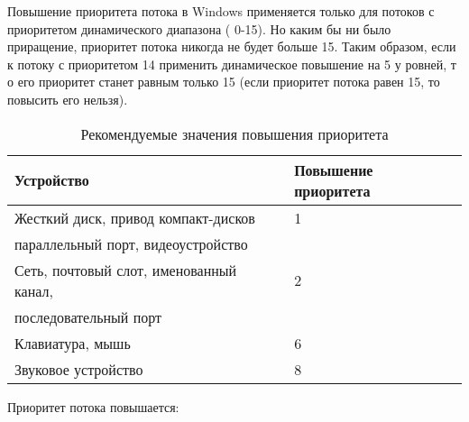 Повышение приоритета потока в Windows применяется только для потоков
с приоритетом динамического диапазона ( 0-15). Но каким бы ни было
приращение, приоритет потока никогда не будет больше 15. Таким образом,
если к потоку с приоритетом 14 применить динамическое повышение на 5
у ровней, т о его приоритет станет равным только 15 (если приоритет
потока равен 15, то повысить его нельзя).

\begin{table}[H]
    \centering
    \caption{Рекомендуемые значения повышения приоритета}
    \begin{tabular}{|l|l|}
        \hline
        \textbf{Устройство} & \textbf{Повышение приоритета} \\
        \hline
        \hline
        Жесткий диск, привод компакт-дисков & 1 \\
        параллельный порт, видеоустройство & \\
        \hline
        Сеть, почтовый слот, именованный канал, & 2 \\
        последовательный порт & \\
        \hline
        Клавиатура, мышь & 6 \\
        \hline
        Звуковое устройство & 8 \\
        \hline
    \end{tabular}
\end{table}

Приоритет потока повышается:

